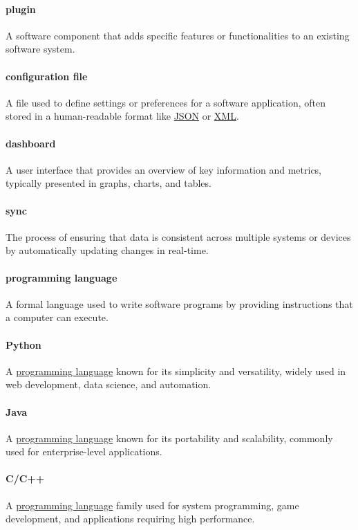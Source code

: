 \documentclass[12pt]{article}
\begin{document}
\paragraph*{plugin}
A software component that adds specific features or functionalities to an existing software system.

\paragraph*{configuration file}
A file used to define settings or preferences for a software application, often stored in a human-readable format like \hyperref[term:JSON]{JSON} or \hyperref[term:XML]{XML}.

\paragraph*{dashboard}
A user interface that provides an overview of key information and metrics, typically presented in graphs, charts, and tables.

\paragraph*{sync}
The process of ensuring that data is consistent across multiple systems or devices by automatically updating changes in real-time.

\paragraph*{programming language}
\label{term:progl}
A formal language used to write software programs by providing instructions that a computer can execute.

\paragraph*{Python}
\label{term:python}
A \hyperref[term:progl]{programming language} known for its simplicity and versatility, widely used in web development, data science, and automation.

\paragraph*{Java}
A \hyperref[term:progl]{programming language} known for its portability and scalability, commonly used for enterprise-level applications.

\paragraph*{C/C++}
A \hyperref[term:progl]{programming language} family used for system programming, game development, and applications requiring high performance.
\end{document}
